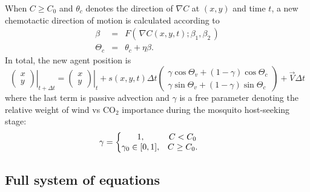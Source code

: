 \documentclass[12pt]{article}
\begin{document}
	
	When $C \geq C_0$ and $\theta_c$ denotes the direction of $\nabla C$ at $(x,y)$ and time $t$, a new chemotactic direction of motion is calculated according to
	\begin{eqnarray*}
	\beta &=& F(\, \nabla C(x,y,t);\beta_1,\beta_2\,) \\
	\Theta_c &=&  \theta_c + \eta\beta.
	\end{eqnarray*}	
	In total, the new agent position is 
	\begin{equation*}
	\left.\begin{pmatrix} x \\ y \end{pmatrix}\right\vert_{t+\Delta t} = \left.\begin{pmatrix} x \\ y \end{pmatrix}\right\vert_{t} + s(x,y,t) \Delta t \begin{pmatrix} \gamma\cos\Theta_v + (1-\gamma)\cos\Theta_c \\ \gamma\sin\Theta_v + (1-\gamma)\sin\Theta_c \end{pmatrix} + \vec V \Delta t
	\end{equation*}
	where the last term is passive advection and $\gamma$ is a free parameter denoting the relative weight of wind vs CO$_2$ importance during the mosquito host-seeking stage:
	\[
	\gamma =  \left\{\begin{matrix} 1, & C < C_0 \\ \gamma_0 \in [0,1], & C \geq C_0 .\end{matrix} \right. 
	\hskip20pt
	\]
	 
	\subsection{Full system of equations}
		
\end{document}

